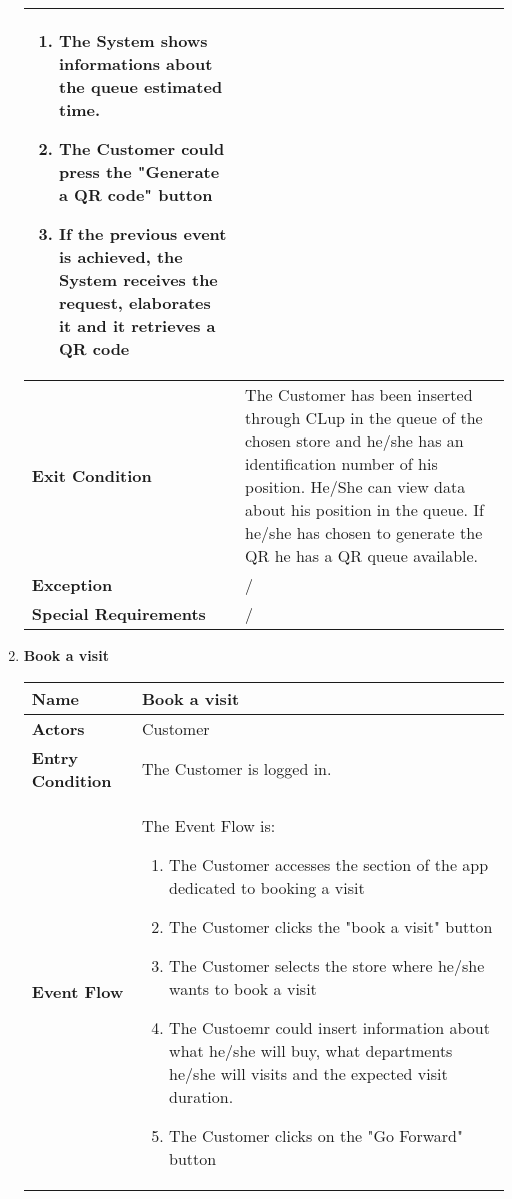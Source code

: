 \begin{enumerate}
{\begin{longtable}{|L{4cm}|L{10cm}|}
\begin{enumerate}
                        \item The System shows informations about the queue estimated time.
                        \item The Customer could press the "Generate a QR code" button
                        \item If the previous event is achieved, the System receives the request, elaborates it and it retrieves a QR code
                    \end{enumerate} \\
                \hline
                \textbf{Exit Condition} & The Customer has been inserted through CLup in the queue of the chosen store and he/she has an identification number of his position. He/She can view data about his position in the queue. If he/she has chosen to generate the QR he has a QR queue available. \\
                \hline
                \textbf{Exception} & / \\
                \hline
                \textbf{Special Requirements} & / \\
                \hline
            \end{longtable}}
            \item \textbf{Book a visit}{\renewcommand{\arraystretch}{2}
            \begin{longtable}{|L{4cm}|L{10cm}|}
                \hline
                \textbf{Name} & Book a visit \\
                \hline
                \textbf{Actors} & Customer \\
                \hline
                \textbf{Entry Condition} & The Customer is logged in. \\
                \hline
                \textbf{Event Flow} & The Event Flow is: \begin{enumerate}
                        \item The Customer accesses the section of the app dedicated to booking a visit
                        \item The Customer clicks the "book a visit" button
                        \item The Customer selects the store where he/she wants to book a visit
                        \item The Custoemr could insert information about what he/she will buy, what departments he/she will visits and the expected visit duration.
                        \item The Customer clicks on the "Go Forward" button

\end{enumerate}
\end{longtable}}
\end{enumerate}
